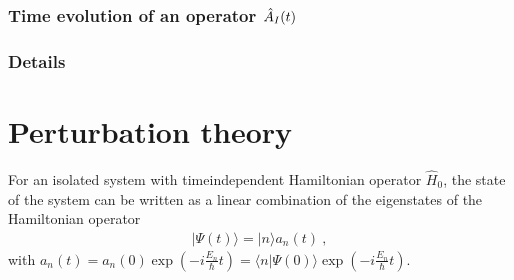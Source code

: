 \documentclass[letterpaper,10pt,english]{jupyterBook}
\begin{document}
\subsubsection*{Time evolution of an operator \protect\(\hat{A}_I(t)\protect\)}
\subsubsection*{Details}


\section{Perturbation theory}
\label{\detokenize{ch/quantum-mechanics/einstein-coeffs-interaction-picture:perturbation-theory}}\label{\detokenize{ch/quantum-mechanics/einstein-coeffs-interaction-picture:quantum-mechanics-einstein-coeffs-interaction-picture-perturbation}}
\sphinxAtStartPar
For an isolated system with time\sphinxhyphen{}independent Hamiltonian operator \(\hat{H}_0\), the state of the system can be written as a linear combination of the eigenstates of the Hamiltonian operator
\begin{equation*}
\begin{split}| \Psi(t) \rangle = | n \rangle a_n(t) \ ,\end{split}
\end{equation*}
\sphinxAtStartPar
with \(a_n(t) = a_n(0) \exp\left( - i \frac{E_n}{\hbar} t \right) = \langle n | \Psi(0) \rangle \exp\left( - i \frac{E_n}{\hbar} t \right) \).
\end{document}
